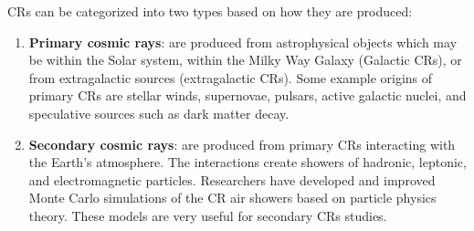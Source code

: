 CRs can be categorized into two types based on
how they are produced:
\begin{enumerate}
    \item \textbf{Primary cosmic rays}:
    are produced from astrophysical objects which may be within the
    Solar system, within the Milky Way Galaxy (Galactic CRs), or
    from extragalactic sources (extragalactic CRs). Some example
    origins of primary CRs are stellar winds, supernovae, pulsars,
    active galactic nuclei, and speculative sources such as dark
    matter decay.
    \item \textbf{Secondary cosmic rays}:
    are produced from primary CRs interacting with the Earth's
    atmosphere. The interactions create showers of hadronic,
    leptonic, and electromagnetic particles. Researchers have
    developed and improved Monte Carlo simulations of the
    CR air showers based on particle physics theory. These models
    are very useful for secondary CRs studies.
\end{enumerate}

